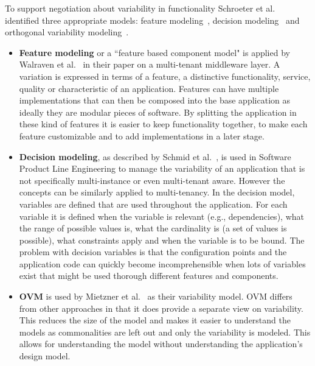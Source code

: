 To support negotiation about variability in functionality Schroeter et al.~\cite{schroeter2012towards} identified three appropriate models: feature modeling~\cite{benavides2010automated,kang1990feature}, decision modeling~\cite{schmid2004customizable,schmid2011comparison} and orthogonal variability modeling~\cite{lauenroth2005software,metzger2007disambiguating}.

\begin{itemize}
\item \textbf{Feature modeling} or a ``feature based component model" is applied by Walraven et al.~\cite{walraven2011middleware} in their paper on a multi-tenant middleware layer. A variation is
expressed in terms of a feature, a distinctive functionality, service, quality or characteristic of an 
application. Features can have multiple implementations that can then be composed into the 
base application as ideally they are modular pieces of software. By splitting the application in 
these kind of features it is easier to keep functionality together, to make each feature 
customizable and to add implementations in a later stage.

\item \textbf{Decision modeling}, as described by Schmid et al.~\cite{schmid2004customizable}, is used in 
Software Product Line Engineering to manage the variability of an application that is not specifically 
multi-instance or even multi-tenant aware. However the concepts can be similarly applied to 
multi-tenancy. In the decision model, variables are defined that are used throughout the 
application. For each variable it is defined when the variable is relevant (e.g., dependencies), 
what the range of possible values is, what the cardinality is (a set of values is possible), what 
constraints apply and when the variable is to be bound. The problem with decision variables is 
that the configuration points and the application code can quickly become incomprehensible 
when lots of variables exist that might be used thorough different features and components.

\item \textbf{\acf{OVM}} is used by Mietzner et al.~\cite{mietzner2009variability} as their variability model. \ac{OVM} differs from other approaches in that it does provide a separate view on variability. This reduces the size of the model and makes it easier to understand the models as commonalities are left out and only the variability is modeled. This allows for understanding the model without understanding the application's design model. 


\end{itemize}
